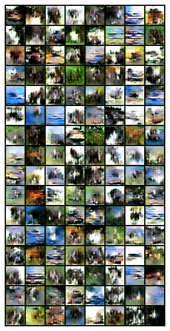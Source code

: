 \begin{figure}[H]
    \centering

    \begin{subfigure}{0.2\textwidth}
        \centering
        \includegraphics[width=0.95\linewidth]{cifar10/32/fake_sample_epoch_0005.png}
        \caption{}
        \label{subfig:cifar10/32/fake_sample_epoch_0005}

\end{subfigure}
\end{figure}
